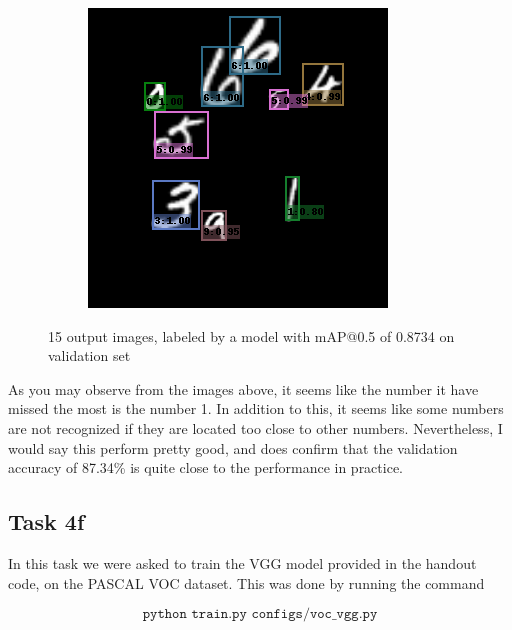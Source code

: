 \begin{figure}[h!]
\begin{subfigure}[b]{0.193\textwidth}
    \end{subfigure}
    \hfill
    \begin{subfigure}[b]{0.193\textwidth}
        \centering
        \includegraphics[width=\textwidth]{Images/mnist_output/14.png}
    \end{subfigure}
    \caption*{15 output images, labeled by a model with mAP@0.5 of 0.8734 on validation set}
\end{figure}

As you may observe from the images above, it seems like the number it have missed the most is the number 1.
In addition to this, it seems like some numbers are not recognized if they are located too close to other numbers.
Nevertheless, I would say this perform pretty good, and does confirm that the validation accuracy of 87.34\% is quite close to the performance in practice.

\clearpage
\subsection*{Task 4f}

In this task we were asked to train the VGG model provided in the handout code, on the PASCAL VOC dataset.
This was done by running the command

\begin{equation*}
    \texttt{python train.py configs/voc\_vgg.py}
\end{equation*}

